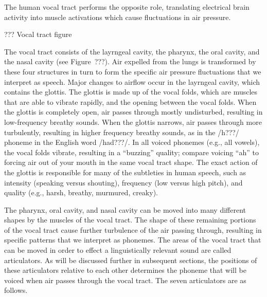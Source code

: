 The human vocal tract performs
the opposite role,
translating electrical brain activity
into muscle activations
which cause fluctuations in air pressure.

??? Vocal tract figure

The vocal tract consists of
the layrngeal cavity,
the pharynx, the oral cavity,
and the nasal cavity
(see Figure~???).
Air expelled from the lungs
is transformed
by these four structures
in turn to form the
specific air pressure fluctuations
that we interpret as speech.
Major changes to airflow
occur in the layrngeal cavity,
which contains the glottis.
The glottis is made up of
the vocal folds,
which are muscles that are able to vibrate rapidly,
and the opening between the vocal folds.
When the glottis is completely open,
air passes through mostly undisturbed,
resulting in low-frequency breathy sounds.
When the glottis narrows,
air passes through more turbulently,
resulting in higher frequency breathy sounds,
as in the /h???/ phoneme
in the English word /had???/.
In all voiced phonemes (e.g., all vowels),
the vocal folds vibrate,
resulting in a ``buzzing'' quality;
compare voicing ``ah'' to
forcing air out of your mouth
in the same vocal tract shape.
The exact action of the glottis
is responsible for many
of the subtleties in human speech,
such as intensity (speaking versus shouting),
frequency (low versus high pitch),
and quality (e.g., harsh, breathy, murmured, creaky).

The pharynx, oral cavity, and nasal cavity
can be moved into many different shapes
by the muscles of the vocal tract.
The shape of these remaining portions
of the vocal tract cause further turbulence
of the air passing through,
resulting in specific patterns
that we interpret as phonemes.
The areas of the vocal tract
that can be moved in order to
effect a linguistically relevant sound
are called articulators.
As will be discussed further
in subsequent sections,
the positions of these articulators
relative to each other
determines the phoneme
that will be voiced
when air passes through
the vocal tract.
The seven articulators are
as follows.

